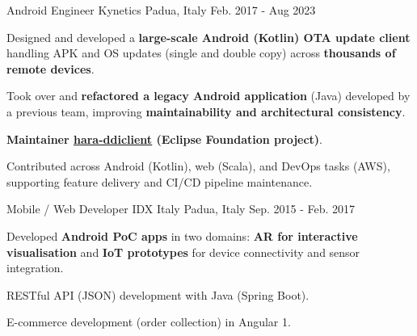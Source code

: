 

\begin{cventries}

  \cventry
    {Android Engineer} %
    {Kynetics} %
    {Padua, Italy} %
    {Feb. 2017 - Aug 2023} %
    {
    \begin{cvitems}
    		\item Designed and developed a \textbf{large-scale Android (Kotlin) OTA update client} handling APK and OS updates (single and double copy) across \textbf{thousands of remote devices}.
    		\item Took over and \textbf{refactored a legacy Android application} (Java) developed by a previous team, improving \textbf{maintainability and architectural consistency}.
    		\item \textbf{Maintainer \href{https://github.com/eclipse-hara/hara-ddiclient}{\underline{hara-ddiclient}} (Eclipse Foundation project)}.
    		\item Contributed across Android (Kotlin), web (Scala), and DevOps tasks (AWS), supporting feature delivery and CI/CD pipeline maintenance.
    \end{cvitems}
    }
\hfill \break

  \cventry
    {Mobile / Web Developer} %
    {IDX Italy} %
	{Padua, Italy} %
    {Sep. 2015 - Feb. 2017} %
    {
      \begin{cvitems} %
      	\item {Developed \textbf{Android PoC apps} in two domains: \textbf{AR for interactive visualisation} and \textbf{IoT prototypes} for device connectivity and sensor integration}.
        \item {RESTful API (JSON) development with Java (Spring Boot)}.
        \item {E-commerce development (order collection) in Angular 1}.
      \end{cvitems}
    }
\hfill \break


\end{cventries}
